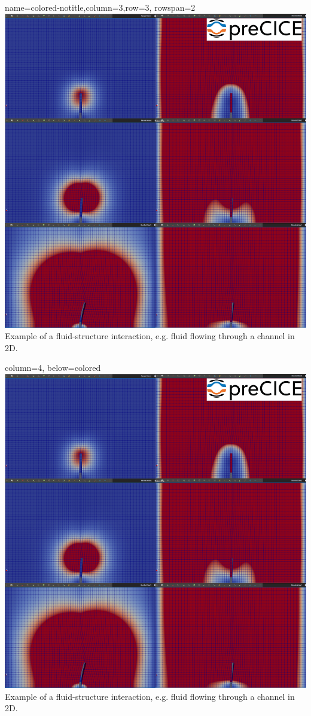 \documentclass[
	paper=a0,
	style=ruled, %
	]{bfhsciposter}
\begin{document}
\begin{tcbposter}[
		poster={
				columns=4,
				rows=7,
				spacing=1cm,
			},]
	\begin{posterboxenv}{name=colored-notitle,column=3,row=3, rowspan=2}
		\includegraphics[width=\linewidth]{sequence}
		Example of a fluid-structure interaction, e.g. fluid flowing through a channel in 2D.
	\end{posterboxenv}

	\begin{posterboxenv}{column=4, below=colored}
		\includegraphics[width=\linewidth]{sequence}
		Example of a fluid-structure interaction, e.g. fluid flowing through a channel in 2D.
	\end{posterboxenv}


\end{tcbposter}
\end{document}
